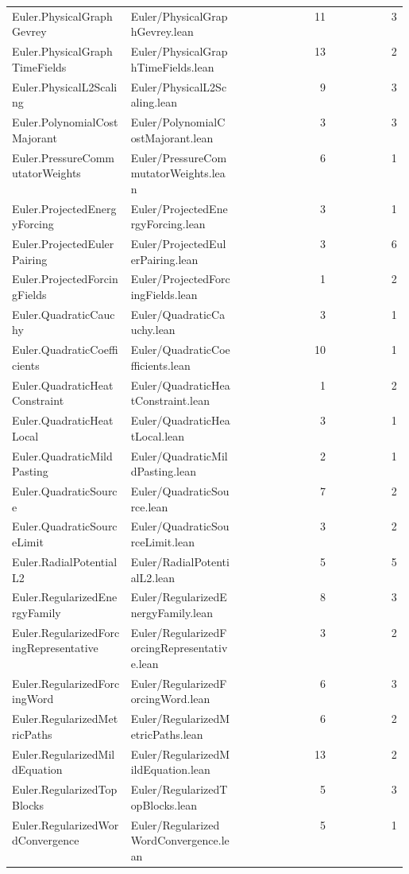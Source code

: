 \begin{longtable}{p{0.30\linewidth}p{0.28\linewidth}rr}
Euler.PhysicalGraphGevrey & Euler/PhysicalGraphGevrey.lean & 11 & 3\\
Euler.PhysicalGraphTimeFields & Euler/PhysicalGraphTimeFields.lean & 13 & 2\\
Euler.PhysicalL2Scaling & Euler/PhysicalL2Scaling.lean & 9 & 3\\
Euler.PolynomialCostMajorant & Euler/PolynomialCostMajorant.lean & 3 & 3\\
Euler.PressureCommutatorWeights & Euler/PressureCommutatorWeights.lean & 6 & 1\\
Euler.ProjectedEnergyForcing & Euler/ProjectedEnergyForcing.lean & 3 & 1\\
Euler.ProjectedEulerPairing & Euler/ProjectedEulerPairing.lean & 3 & 6\\
Euler.ProjectedForcingFields & Euler/ProjectedForcingFields.lean & 1 & 2\\
Euler.QuadraticCauchy & Euler/QuadraticCauchy.lean & 3 & 1\\
Euler.QuadraticCoefficients & Euler/QuadraticCoefficients.lean & 10 & 1\\
Euler.QuadraticHeatConstraint & Euler/QuadraticHeatConstraint.lean & 1 & 2\\
Euler.QuadraticHeatLocal & Euler/QuadraticHeatLocal.lean & 3 & 1\\
Euler.QuadraticMildPasting & Euler/QuadraticMildPasting.lean & 2 & 1\\
Euler.QuadraticSource & Euler/QuadraticSource.lean & 7 & 2\\
Euler.QuadraticSourceLimit & Euler/QuadraticSourceLimit.lean & 3 & 2\\
Euler.RadialPotentialL2 & Euler/RadialPotentialL2.lean & 5 & 5\\
Euler.RegularizedEnergyFamily & Euler/RegularizedEnergyFamily.lean & 8 & 3\\
Euler.RegularizedForcingRepresentative & Euler/RegularizedForcingRepresentative.lean & 3 & 2\\
Euler.RegularizedForcingWord & Euler/RegularizedForcingWord.lean & 6 & 3\\
Euler.RegularizedMetricPaths & Euler/RegularizedMetricPaths.lean & 6 & 2\\
Euler.RegularizedMildEquation & Euler/RegularizedMildEquation.lean & 13 & 2\\
Euler.RegularizedTopBlocks & Euler/RegularizedTopBlocks.lean & 5 & 3\\
Euler.RegularizedWordConvergence & Euler/RegularizedWordConvergence.lean & 5 & 1\\

\end{longtable}
